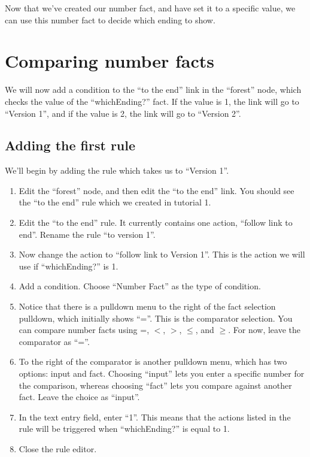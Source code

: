 \documentclass{article}
\begin{document}
Now that we've created our number fact, and have set it to a specific 
value, we can use this number fact to decide which ending to show.

\section{Comparing number facts}

We will now add a condition to the ``to the end'' link in the 
``forest'' node, which checks the value of the ``whichEnding?'' fact. 
If the value is 1, the link will go to ``Version 1'', and if the 
value is 2, the link will go to ``Version 2''.

\subsection{Adding the first rule}

We'll begin by adding the rule which takes us to ``Version 1''.

\begin{enumerate}
    \item Edit the ``forest'' node, and then edit the ``to the end'' 
    link. You should see the ``to the end'' rule which we created in 
    tutorial 1.
    \item Edit the ``to the end'' rule. It currently contains one 
    action, ``follow link to end''. Rename the rule ``to version 1''.
    \item Now change the action to ``follow link to Version 1''. This 
    is the action we will use if ``whichEnding?'' is 1.
    \item Add a condition. Choose ``Number Fact'' as the type of 
    condition.
    \item Notice that there is a pulldown menu to the right of the 
    fact selection pulldown, which initially shows ``=''. This is the 
    comparator selection. You can compare number facts using =, $<$, 
    $>$, 
    $\le$, and $\ge$. For now, leave the comparator as ``=''.
    \item To the right of the comparator is another pulldown menu, 
    which has two options: input and fact. Choosing ``input'' lets 
    you enter a specific number for the comparison, whereas choosing 
    ``fact'' lets you compare against another fact. Leave the choice 
    as ``input''.
    \item In the text entry field, enter ``1''. This means that the 
    actions listed in the rule will be triggered when 
    ``whichEnding?'' is equal to 1.
    \item Close the rule editor.
\end{enumerate}
\end{document}
